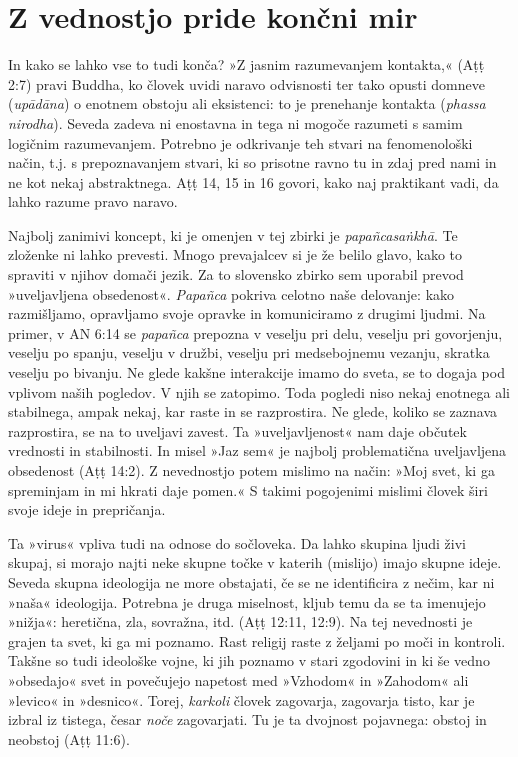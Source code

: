 \section{Z vednostjo pride končni mir}
\label{vednostjo}

In kako se lahko vse to tudi konča? »Z jasnim razumevanjem kontakta,«
(Aṭṭ 2:7) pravi Buddha, ko človek uvidi naravo odvisnosti ter tako
opusti domneve (\emph{upādāna}) o enotnem obstoju ali eksistenci: to je
prenehanje kontakta (\emph{phassa nirodha}). Seveda zadeva ni enostavna
in tega ni mogoče razumeti s samim logičnim razumevanjem. Potrebno je
odkrivanje teh stvari na fenomenološki način, t.j. s prepoznavanjem
stvari, ki so prisotne ravno tu in zdaj pred nami in ne kot nekaj
abstraktnega. Aṭṭ 14, 15 in 16 govori, kako naj praktikant vadi, da
lahko razume pravo naravo.

Najbolj zanimivi koncept, ki je omenjen v tej zbirki je
\emph{papañcasaṅkhā}. Te zloženke ni lahko prevesti. Mnogo prevajalcev
si je že belilo glavo, kako to spraviti v njihov domači jezik. Za to
slovensko zbirko sem uporabil prevod »uveljavljena obsedenost«.
\emph{Papañca} pokriva celotno naše delovanje: kako razmišljamo,
opravljamo svoje opravke in komuniciramo z drugimi ljudmi. Na primer, v
AN 6:14 se \emph{papañca} prepozna v veselju pri delu, veselju pri
govorjenju, veselju po spanju, veselju v družbi, veselju pri
medsebojnemu vezanju, skratka veselju po bivanju. Ne glede kakšne
interakcije imamo do sveta, se to dogaja pod vplivom naših pogledov. V
njih se zatopimo. Toda pogledi niso nekaj enotnega ali stabilnega, ampak
nekaj, kar raste in se razprostira. Ne glede, koliko se zaznava
razprostira, se na to uveljavi zavest. Ta »uveljavljenost« nam daje
občutek vrednosti in stabilnosti. In misel »Jaz sem« je najbolj
problematična uveljavljena obsedenost (Aṭṭ 14:2). Z nevednostjo potem
mislimo na način: »Moj svet, ki ga spreminjam in mi hkrati daje pomen.«
S takimi pogojenimi mislimi človek širi svoje ideje in prepričanja.

Ta »virus« vpliva tudi na odnose do sočloveka. Da lahko skupina ljudi
živi skupaj, si morajo najti neke skupne točke v katerih (mislijo) imajo
skupne ideje. Seveda skupna ideologija ne more obstajati, če se ne
identificira z nečim, kar ni »naša« ideologija. Potrebna je druga
miselnost, kljub temu da se ta imenujejo »nižja«: heretična, zla,
sovražna, itd. (Aṭṭ 12:11, 12:9). Na tej nevednosti je grajen ta svet,
ki ga mi poznamo. Rast religij raste z željami po moči in kontroli.
Takšne so tudi ideološke vojne, ki jih poznamo v stari zgodovini in ki
še vedno »obsedajo« svet in povečujejo napetost med »Vzhodom« in
»Zahodom« ali »levico« in »desnico«. Torej, \emph{karkoli} človek
zagovarja, zagovarja tisto, kar je izbral iz tistega, česar \emph{noče}
zagovarjati. Tu je ta dvojnost pojavnega: obstoj in neobstoj (Aṭṭ 11:6).

